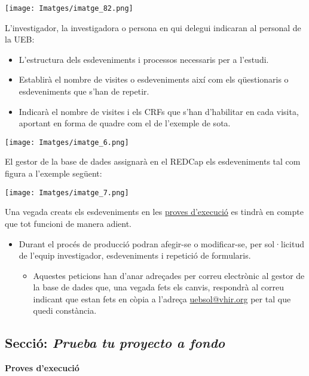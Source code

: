 \documentclass[
]{article}
\providecommand{\tightlist}{%
  \setlength{\itemsep}{0pt}\setlength{\parskip}{0pt}}
\begin{document}
\texttt{[image: Imatges/imatge\_82.png]}

L'investigador, la investigadora o persona en qui delegui indicaran al personal de la UEB:

\begin{itemize}
\tightlist
\item
  L'estructura dels esdeveniments i processos necessaris per a l'estudi.
\item
  Establirà el nombre de visites o esdeveniments així com els qüestionaris o esdeveniments que s'han de repetir.
\item
  Indicarà el nombre de visites i els CRFs que s'han d'habilitar en cada visita, aportant en forma de quadre com el de l'exemple de sota.
\end{itemize}

\texttt{[image: Imatges/imatge\_6.png]}

El gestor de la base de dades assignarà en el REDCap els esdeveniments tal com figura a l'exemple següent:

\texttt{[image: Imatges/imatge\_7.png]}

Una vegada creats els esdeveniments en les \protect\hyperlink{en2}{proves d'execució} es tindrà en compte que tot funcioni de manera adient.

\begin{itemize}
\tightlist
\item
  Durant el procés de producció podran afegir-se o modificar-se, per sol·licitud de l'equip investigador, esdeveniments i repetició de formularis.

  \begin{itemize}
  \tightlist
  \item
    Aquestes peticions han d'anar adreçades per correu electrònic al gestor de la base de dades que, una vegada fets els canvis, respondrà al correu indicant que estan fets en còpia a l'adreça \href{mailto:uebsol@vhir.org?subject=Proves\%20d'execució\%20RedCAP}{uebsol@vhir.org} per tal que quedi constància.
  \end{itemize}
\end{itemize}

\hypertarget{en2}{%
\subsection{\texorpdfstring{\textbf{Secció}: \emph{Prueba tu proyecto a fondo}}{Secció: Prueba tu proyecto a fondo}}\label{en2}}

\textbf{Proves d'execució}
\end{document}
